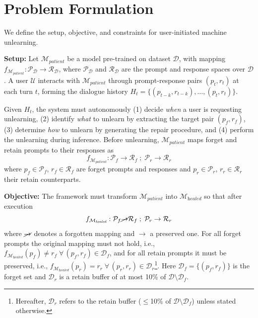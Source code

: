 \section{Problem Formulation}
\label{sec:PS}
We define the setup, objective, and constraints for user-initiated machine unlearning.

\medskip
\noindent
\textbf{Setup:}
Let $\mathcal{M}_{\textit{patient}}$ be a model pre-trained on dataset $\mathcal{D}$, with mapping $f_{\mathcal{M}_{\textit{patient}}} : \mathcal{P}_{\mathcal{D}} \rightarrow \mathcal{R}_{\mathcal{D}}$, where $\mathcal{P}_{\mathcal{D}}$ and $\mathcal{R}_{\mathcal{D}}$ are the prompt and response spaces over $\mathcal{D}$. A user $\mathcal{U}$ interacts with $\mathcal{M}_{\textit{patient}}$ through prompt-response pairs $(p_t, r_t)$ at each turn $t$, forming the dialogue history $H_t = \{(p_{t-k}, r_{t-k}), \ldots, (p_t, r_t)\}$. 

Given $H_t$, the system must autonomously (1) decide \textit{when} a user is requesting unlearning, (2) identify \textit{what} to unlearn by extracting the target pair $(p_f, r_f)$, (3) determine \textit{how} to unlearn by generating the repair procedure, and (4) perform the unlearning during inference. Before unlearning, $\mathcal{M}_{\textit{patient}}$ maps forget and retain prompts to their responses as
\begin{equation}
f_{\mathcal{M}_{\textit{patient}}} :
\mathcal{P}_{f} \rightarrow \mathcal{R}_f \; ; \;
\mathcal{P}_{r} \rightarrow \mathcal{R}_r
\label{eq:before_unlearn}
\end{equation}
where $p_f \in \mathcal{P}_f$, $r_f \in \mathcal{R}_f$ are forget prompts and responses and $p_r \in \mathcal{P}_r$, $r_r \in \mathcal{R}_r$ their retain counterparts.

\medskip 
\noindent
\textbf{Objective:}
The framework must transform $\mathcal{M}_{\textit{patient}}$ into $\mathcal{M}_{\textit{healed}}$ so that after execution
\begin{equation}
f_{\mathcal{M}_{\textit{healed}}} :
\mathcal{P}_f \cancel{\rightarrow} \mathcal{R}_f \; ; \;
\mathcal{P}_r \rightarrow \mathcal{R}_r
\label{eq:after_unlearn}
\end{equation}
where $\cancel{\rightarrow}$ denotes a forgotten mapping and $\rightarrow$ a preserved one. For all forget prompts the original mapping must not hold, i.e., $f_{\mathcal{M}_{\textit{healed}}}(p_f) \neq r_f \; \forall \, (p_f, r_f) \in \mathcal{D}_f$, and for all retain prompts it must be preserved, i.e., $f_{\mathcal{M}_{\textit{healed}}}(p_r) = r_r \; \forall \, (p_r, r_r) \in \mathcal{D}_r$\footnote{Hereafter, $\mathcal{D}_r$ refers to the retain buffer ($\leq$10\% of $\mathcal{D} \setminus \mathcal{D}_f$) unless stated otherwise.}. Here $\mathcal{D}_f = \{(p_f, r_f)\}$ is the forget set and $\mathcal{D}_r$ is a retain buffer of at most 10\% of $\mathcal{D} \setminus \mathcal{D}_f$.

